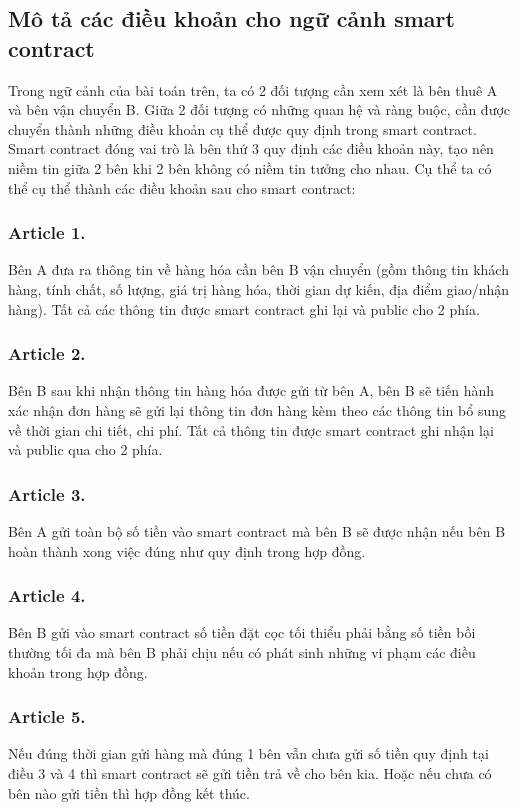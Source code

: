 \subsection{Mô tả các điều khoản cho ngữ cảnh smart contract}

Trong ngữ cảnh của bài toán trên, ta có 2 đối tượng cần xem xét là bên thuê A và bên vận chuyển B. Giữa 2 đối tượng có những quan hệ và ràng buộc, cần được chuyển thành những điều khoản cụ thể được quy định trong smart contract. Smart contract đóng vai trò là bên thứ 3 quy định các điều khoản này, tạo nên niềm tin giữa 2 bên khi 2 bên không có niềm tin tưởng cho nhau. Cụ thể ta có thể cụ thể thành các điều khoản sau cho smart contract:


\subsubsection*{Article 1.}
Bên A đưa ra thông tin về hàng hóa cần bên B vận chuyển (gồm thông tin khách hàng, tính chất, số lượng, giá trị hàng hóa, thời gian dự kiến, địa điểm giao/nhận hàng). Tất cả các thông tin được smart contract ghi lại và public cho 2 phía.

\subsubsection*{Article 2.}
Bên B sau khi nhận thông tin hàng hóa được gửi từ bên A, bên B sẽ tiến hành xác nhận đơn hàng sẽ gửi lại thông tin đơn hàng kèm theo các thông tin bổ sung về thời gian chi tiết, chi phí. Tất cả thông tin được smart contract ghi nhận lại và public qua cho 2 phía.

\subsubsection*{Article 3.}
Bên A gửi toàn bộ số tiền vào smart contract mà bên B sẽ được nhận nếu bên B hoàn thành xong việc đúng như quy định trong hợp đồng.

\subsubsection*{Article 4.}
Bên B gửi vào smart contract số tiền đặt cọc tối thiểu phải bằng số tiền bồi thường tối đa mà bên B phải chịu nếu có phát sinh những vi phạm các điều khoản trong hợp đồng.

\subsubsection*{Article 5.}
Nếu đúng thời gian gửi hàng mà đúng 1 bên vẫn chưa gửi số tiền quy định tại điều 3 và 4 thì smart contract sẽ gửi tiền trả về cho bên kia. Hoặc nếu chưa có bên nào gửi tiền thì hợp đồng kết thúc.

